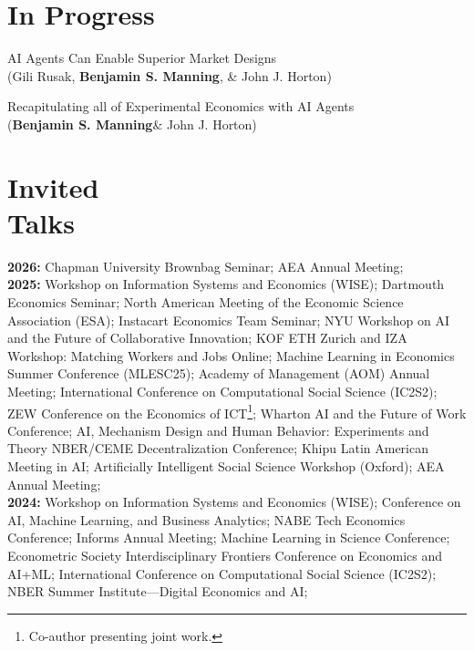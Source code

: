 \documentclass[margin,line,pifont,palatino,courier, 9pt]{res}
\begin{document}
\begin{resume}
\section{\sc In Progress}

AI Agents Can Enable Superior Market Designs\\
(Gili Rusak\footnotemark[\value{footnote}], \textbf{Benjamin S. Manning}\footnotemark[\value{footnote}], \& John J. Horton)

Recapitulating all of Experimental Economics with AI Agents\\
(\textbf{Benjamin S. Manning}\footnotemark[\value{footnote}] \& John J. Horton\footnotemark[\value{footnote}])

\section{\sc Invited\\Talks\footnotemark}
\textbf{2026:} 
Chapman University Brownbag Seminar;
AEA Annual Meeting;\vspace{2mm}\\
\textbf{2025:} 
Workshop on Information Systems and Economics (WISE);
Dartmouth Economics Seminar;
North American Meeting of the Economic Science Association (ESA);
Instacart Economics Team Seminar;
NYU Workshop on AI and the Future of Collaborative Innovation;
KOF ETH Zurich and IZA Workshop: Matching Workers and Jobs Online;
Machine Learning in Economics Summer Conference (MLESC25);
Academy of Management (AOM) Annual Meeting;
International Conference on Computational Social Science (IC2S2);
ZEW Conference on the Economics of ICT\footnote{Co-author presenting joint work.};
Wharton AI and the Future of Work Conference;
AI, Mechanism Design and Human Behavior: Experiments and Theory NBER/CEME Decentralization Conference;
Khipu Latin American Meeting in AI;
Artificially Intelligent Social Science Workshop (Oxford);
AEA Annual Meeting;\vspace{2mm}\\
\textbf{2024:} Workshop on Information Systems and Economics (WISE)\footnotemark[\value{footnote}];
Conference on AI, Machine Learning, and Business Analytics;
NABE Tech Economics Conference; 
Informs Annual Meeting\footnotemark[\value{footnote}];
Machine Learning in Science Conference;
Econometric Society Interdisciplinary Frontiers Conference on Economics and AI+ML; 
International Conference on Computational Social Science (IC2S2)\footnotemark[\value{footnote}];
NBER Summer Institute---Digital Economics and AI\footnotemark[\value{footnote}];

\end{resume}
\end{document}
